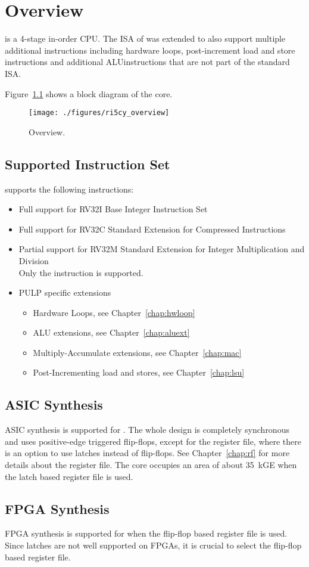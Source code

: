 \chapter{Overview}

\rvcore is a 4-stage in-order \riscv CPU. The ISA of \rvcore was extended to
also support multiple additional instructions including hardware loops,
post-increment load and store instructions and additional ALUinstructions that
are not part of the standard \riscv ISA.

Figure~\ref{fig:ri5cy_overview} shows a block diagram of the core.

\begin{figure}[H]
  \centering
  \texttt{[image: ./figures/ri5cy\_overview]}
  \caption{\rvcore Overview.}
  \label{fig:ri5cy_overview}
\end{figure}


\section{Supported Instruction Set}

\rvcore supports the following instructions:

\begin{itemize}
  \item Full support for RV32I Base Integer Instruction Set
  \item Full support for RV32C Standard Extension for Compressed Instructions
  \item Partial support for RV32M Standard Extension for Integer Multiplication
    and Division \\
        Only the  instruction is supported.
  \item PULP specific extensions \\
        \begin{itemize}
          \item Hardware Loops, see Chapter~\ref{chap:hwloop}
          \item ALU extensions, see Chapter~\ref{chap:aluext}
          \item Multiply-Accumulate extensions, see Chapter~\ref{chap:mac}
          \item Post-Incrementing load and stores, see Chapter~\ref{chap:lsu}
        \end{itemize}
\end{itemize}

\section{ASIC Synthesis}
ASIC synthesis is supported for \rvcore. The whole design is completely
synchronous and uses positive-edge triggered flip-flops, except for the register
file, where there is an option to use latches instead of flip-flops. See
Chapter~\ref{chap:rf} for more details about the register file. The core
occupies an area of about 35~kGE when the latch based register file is used.

\section{FPGA Synthesis}
FPGA synthesis is supported for \rvcore when the flip-flop based register file
is used. Since latches are not well supported on FPGAs, it is crucial to select
the flip-flop based register file.
